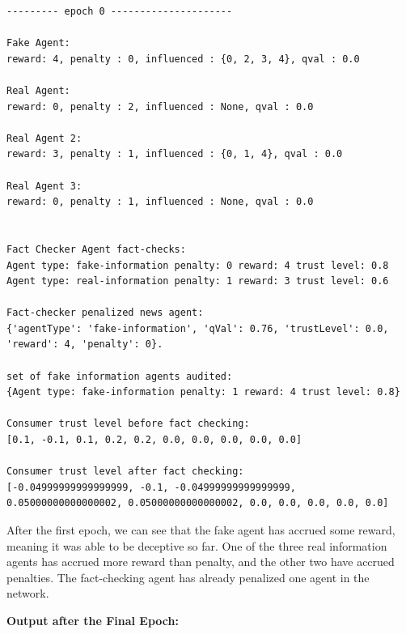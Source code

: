\documentclass[twoside]{article}
\begin{document}
\begin{verbatim}
--------- epoch 0 ---------------------

Fake Agent: 
reward: 4, penalty : 0, influenced : {0, 2, 3, 4}, qval : 0.0

Real Agent: 
reward: 0, penalty : 2, influenced : None, qval : 0.0

Real Agent 2: 
reward: 3, penalty : 1, influenced : {0, 1, 4}, qval : 0.0

Real Agent 3: 
reward: 0, penalty : 1, influenced : None, qval : 0.0


Fact Checker Agent fact-checks: 
Agent type: fake-information penalty: 0 reward: 4 trust level: 0.8
Agent type: real-information penalty: 1 reward: 3 trust level: 0.6

Fact-checker penalized news agent: 
{'agentType': 'fake-information', 'qVal': 0.76, 'trustLevel': 0.0, 'reward': 4, 'penalty': 0}.

set of fake information agents audited:  
{Agent type: fake-information penalty: 1 reward: 4 trust level: 0.8}

Consumer trust level before fact checking:
[0.1, -0.1, 0.1, 0.2, 0.2, 0.0, 0.0, 0.0, 0.0, 0.0]

Consumer trust level after fact checking: 
[-0.04999999999999999, -0.1, -0.04999999999999999, 
0.05000000000000002, 0.05000000000000002, 0.0, 0.0, 0.0, 0.0, 0.0]

\end{verbatim}

After the first epoch, we can see that the fake agent has accrued some reward, meaning it was able to be deceptive so far. One of the three real information agents has accrued more reward than penalty, and the other two have accrued penalties. The fact-checking agent has already penalized one agent in the network.

\textbf{Output after the Final Epoch: }
\end{document}

